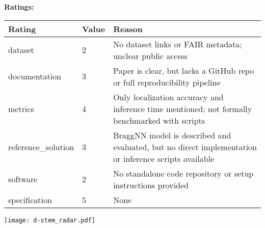 {{{\bf Ratings:} ~ \\

\begin{tabular}{p{} p{} p{}}
\hline
Rating & Value & Reason \\
\hline
dataset & 2 & No dataset links or FAIR metadata; unclear public access
 \\
documentation & 3 & Paper is clear, but lacks a GitHub repo or full reproducibility pipeline
 \\
metrics & 4 & Only localization accuracy and inference time mentioned; not formally benchmarked with scripts
 \\
reference\_solution & 3 & BraggNN model is described and evaluated, but no direct implementation or inference scripts available
 \\
software & 2 & No standalone code repository or setup instructions provided
 \\
specification & 5 & None
 \\
\hline
\end{tabular}

\texttt{[image: d-stem\_radar.pdf]}
}}
\clearpage